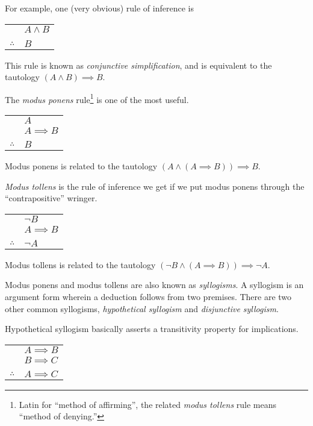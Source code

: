 \documentclass[10pt,]{book}
\theoremstyle{plain}
\theoremstyle{definition}
\theoremstyle{definition}
\numberwithin{equation}{section}
\newcommand{\hrulethin}  {\noalign{\hrule height 0.04em}}
\begin{document}
    For example, one (very obvious) rule of inference is
\begin{tabular}{ll}
&\(A \land B\)\tabularnewline[0pt]
&\tabularnewline\hrulethin
\(\therefore\)&\(B\)
\end{tabular}
\par

    This rule is known as
    \emph{conjunctive simplification}, and
    is equivalent to the tautology \((A \land B) \implies B\).
\par

    The \emph{modus ponens}
    rule\footnote{Latin for ``method of affirming'',
    the related \emph{modus tollens} rule means ``method of denying.''\label{fn-18}}
    is one of the most useful.
\begin{tabular}{ll}
&\(A\)\tabularnewline[0pt]
&\(A \implies B\)\tabularnewline[0pt]
&\tabularnewline\hrulethin
\(\therefore\)&\(B\)
\end{tabular}
\par

    Modus ponens is related to the tautology \((A \land (A \implies B)) \implies B\).
\par

    \emph{Modus tollens}
    is the rule of inference we get if we put modus ponens
    through the ``contrapositive'' wringer.
\begin{tabular}{ll}
&\({\lnot}B\)\tabularnewline[0pt]
&\(A \implies B\)\tabularnewline[0pt]
&\tabularnewline\hrulethin
\(\therefore\)&\({\lnot}A\)
\end{tabular}
\par

    Modus tollens is related to the tautology \(({\lnot}B \land (A \implies B)) \implies {\lnot}A\).
\par

    Modus ponens and modus tollens are also known as
    \emph{syllogisms}. A
    syllogism is an argument form wherein a deduction follows from two premises.
    There are two other common syllogisms,
    \emph{hypothetical syllogism} and
    \emph{disjunctive syllogism}.
\par

    Hypothetical syllogism basically asserts a transitivity property for
    implications.
\begin{tabular}{ll}
&\(A \implies B\)\tabularnewline[0pt]
&\(B \implies C\)\tabularnewline[0pt]
&\tabularnewline\hrulethin
\(\therefore\)&\(A \implies C\)
\end{tabular}
\par
\end{document}
